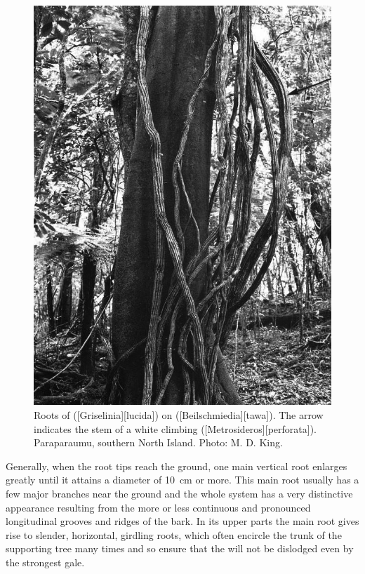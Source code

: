 \begin{figure}[t]
\begin{minipage}[t]{\textwidth}
\begin{minipage}[t]{(\textwidth-\fgap) * \real{0.505}}
			\includegraphics[width=\textwidth]{graphics/fig_047}
			\caption[Roots of puka on tawa]{Roots of  ([Griselinia][lucida]) on  ([Beilschmiedia][tawa]).
			The arrow indicates the stem of a white climbing  ([Metrosideros][perforata]).
			Paraparaumu, southern North Island.
			Photo: M. D. King.}%
			\label{fig:47puka-roots}
		\end{minipage}
	\end{minipage}
\end{figure}

Generally, when the root tips reach the ground, one main vertical root enlarges greatly until it attains a diameter of \SI{10}{\centi\metre} or more.
This main root usually has a few major branches near the ground and the whole system has a very distinctive appearance resulting from the more or less continuous and pronounced longitudinal grooves and ridges of the bark.
In its upper parts the main root gives rise to slender, horizontal, girdling roots, which often encircle the trunk of the supporting tree many times and so ensure that the  will not be dislodged even by the strongest gale.

